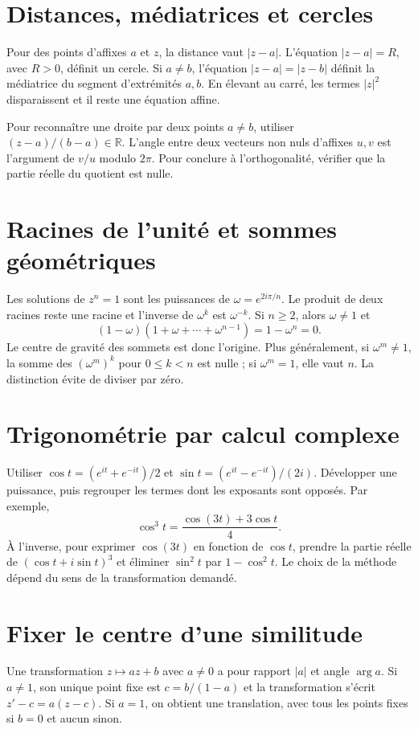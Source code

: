 \documentclass[11pt,a4paper]{article}
\begin{document}
\section*{Distances, médiatrices et cercles}
Pour des points d’affixes $a$ et $z$, la distance vaut $|z-a|$. L’équation $|z-a|=R$, avec $R>0$, définit un cercle. Si $a\ne b$, l’équation $|z-a|=|z-b|$ définit la médiatrice du segment d’extrémités $a,b$. En élevant au carré, les termes $|z|^2$ disparaissent et il reste une équation affine.

Pour reconnaître une droite par deux points $a\ne b$, utiliser $(z-a)/(b-a)\in\mathbb R$. L’angle entre deux vecteurs non nuls d’affixes $u,v$ est l’argument de $v/u$ modulo $2\pi$. Pour conclure à l’orthogonalité, vérifier que la partie réelle du quotient est nulle.

\section*{Racines de l’unité et sommes géométriques}
Les solutions de $z^n=1$ sont les puissances de $\omega=e^{2i\pi/n}$. Le produit de deux racines reste une racine et l’inverse de $\omega^k$ est $\omega^{-k}$. Si $n\ge2$, alors $\omega\ne1$ et
\[ (1-\omega)(1+\omega+\cdots+\omega^{n-1})=1-\omega^n=0. \]
Le centre de gravité des sommets est donc l’origine. Plus généralement, si $\omega^m\ne1$, la somme des $(\omega^m)^k$ pour $0\le k<n$ est nulle ; si $\omega^m=1$, elle vaut $n$. La distinction évite de diviser par zéro.

\section*{Trigonométrie par calcul complexe}
Utiliser $\cos t=(e^{it}+e^{-it})/2$ et $\sin t=(e^{it}-e^{-it})/(2i)$. Développer une puissance, puis regrouper les termes dont les exposants sont opposés. Par exemple,
\[ \cos^3t=\frac{\cos(3t)+3\cos t}{4}. \]
À l’inverse, pour exprimer $\cos(3t)$ en fonction de $\cos t$, prendre la partie réelle de $(\cos t+i\sin t)^3$ et éliminer $\sin^2t$ par $1-\cos^2t$. Le choix de la méthode dépend du sens de la transformation demandé.

\section*{Fixer le centre d’une similitude}
Une transformation $z\mapsto az+b$ avec $a\ne0$ a pour rapport $|a|$ et angle $\arg a$. Si $a\ne1$, son unique point fixe est $c=b/(1-a)$ et la transformation s’écrit $z'-c=a(z-c)$. Si $a=1$, on obtient une translation, avec tous les points fixes si $b=0$ et aucun sinon.
\end{document}
